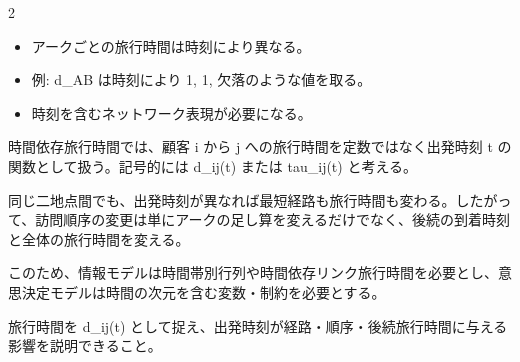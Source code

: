 

\vspace{1.5mm}

\begin{multicols}{2}

\footnotesize

\raggedcolumns


\begin{itemize}
\item アークごとの旅行時間は時刻により異なる。
\item 例: d\_AB は時刻により 1, 1, 欠落のような値を取る。
\item 時刻を含むネットワーク表現が必要になる。
\end{itemize}

時間依存旅行時間では、顧客 i から j への旅行時間を定数ではなく出発時刻 t の関数として扱う。記号的には d\_ij(t) または tau\_ij(t) と考える。\par

同じ二地点間でも、出発時刻が異なれば最短経路も旅行時間も変わる。したがって、訪問順序の変更は単にアークの足し算を変えるだけでなく、後続の到着時刻と全体の旅行時間を変える。\par

このため、情報モデルは時間帯別行列や時間依存リンク旅行時間を必要とし、意思決定モデルは時間の次元を含む変数・制約を必要とする。\par

旅行時間を d\_ij(t) として捉え、出発時刻が経路・順序・後続旅行時間に与える影響を説明できること。\par


\end{multicols}
